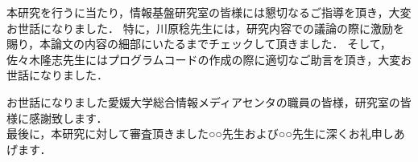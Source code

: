 \documentclass{thesis}
\begin{document}


\tableofcontents











\acknowledgement

本研究を行うに当たり，情報基盤研究室の皆様には懇切なるご指導を頂き，大変お世話になりました．
特に，川原稔先生には，研究内容での議論の際に激励を賜り，本論文の内容の細部にいたるまでチェックして頂きました．
そして，佐々木隆志先生にはプログラムコードの作成の際に適切なご助言を頂き，大変お世話になりました．

お世話になりました愛媛大学総合情報メディアセンタの職員の皆様，研究室の皆様に感謝致します．\\
最後に，本研究に対して審査頂きました○○先生および○○先生に深くお礼申しあげます．

　
 
 
 \nocite{*}
% 
\end{document}
